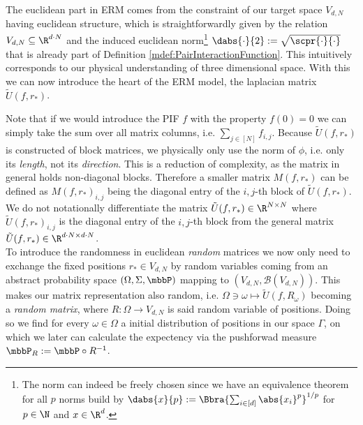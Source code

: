 The euclidean part in ERM comes from the constraint of our target space $V_{d,N}$ having euclidean structure, which is straightforwardly given by the relation $V_{d,N} \subseteq \R^{d\cdot N}$ and the induced euclidean norm\footnote{The norm can indeed be freely chosen since we have an equivalence theorem for all $p$ norms build by $\dabs{x}{p}:=\Bbra{\sum_{i\in[d]}\abs{x_i}^p}^{1/p}$ for $p\in\N$ and $x\in\R^d$.} $\dabs{\cdot}{2} := \sqrt{\scpr{\cdot}{\cdot}}$ that is already part of Definition \ref{mdef:PairInteractionFunction}. This intuitively corresponds to our physical understanding of three dimensional space. With this we can now introduce the heart of the ERM model, the laplacian matrix $\tilde U(f,r_*)$.

Note that if we would introduce the PIF $f$ with the property $f(0) = 0$ we can simply take the sum over all matrix columns, i.e. $\sum_{j\in[N]}f_{i,j}$. Because $\tilde U(f,r_*)$ is constructed of block matrices, we physically only use the norm of $\phi$, i.e. only its \emph{length}, not its \emph{direction}. This is a reduction of complexity, as the matrix in general holds non-diagonal blocks. Therefore a smaller matrix $M(f,r_*)$ can be defined as $M(f,r_*)_{i,j}$ being the diagonal entry of the $i,j$-th block of $\tilde U(f,r_*)$. We do not notationally differentiate the matrix $\tilde U(f,r_*)\in\R^{N\times N}$ where $\tilde U(f,r_*)_{i,j}$ is the diagonal entry of the $i,j$-th block from the general matrix $\tilde U(f,r_*)\in\R^{d\cdot N\times d\cdot N}$.\\

To introduce the randomness in euclidean \emph{random} matrices we now only need to exchange the fixed positions $r_*\in V_{d,N}$ by random variables coming from an abstract probability space $(\Omega,\Sigma,\mbbP)$ mapping to $(V_{d,N},\mathcal{B}(V_{d,N}))$. This makes our matrix representation also random, i.e. $\Omega\ni\omega\mapsto \tilde U(f,R_\omega)$ becoming a \emph{random matrix}, where $R:\Omega\to V_{d,N}$ is said random variable of positions. Doing so we find for every $\omega\in\Omega$ a initial distribution of positions in our space $\Gamma$, on which we later can calculate the expectency via the pushforwad measure $\mbbP_R:=\mbbP\circ R^{-1}$. 
